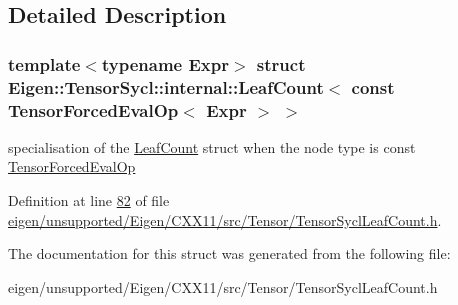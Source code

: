 \subsection{Detailed Description}
\subsubsection*{template$<$typename Expr$>$\newline
struct Eigen\+::\+Tensor\+Sycl\+::internal\+::\+Leaf\+Count$<$ const Tensor\+Forced\+Eval\+Op$<$ Expr $>$ $>$}

specialisation of the \hyperlink{struct_eigen_1_1_tensor_sycl_1_1internal_1_1_leaf_count}{Leaf\+Count} struct when the node type is const \hyperlink{class_eigen_1_1_tensor_forced_eval_op}{Tensor\+Forced\+Eval\+Op} 

Definition at line \hyperlink{eigen_2unsupported_2_eigen_2_c_x_x11_2src_2_tensor_2_tensor_sycl_leaf_count_8h_source_l00082}{82} of file \hyperlink{eigen_2unsupported_2_eigen_2_c_x_x11_2src_2_tensor_2_tensor_sycl_leaf_count_8h_source}{eigen/unsupported/\+Eigen/\+C\+X\+X11/src/\+Tensor/\+Tensor\+Sycl\+Leaf\+Count.\+h}.



The documentation for this struct was generated from the following file\+:\begin{DoxyCompactItemize}
\item 
eigen/unsupported/\+Eigen/\+C\+X\+X11/src/\+Tensor/\+Tensor\+Sycl\+Leaf\+Count.\+h\end{DoxyCompactItemize}
